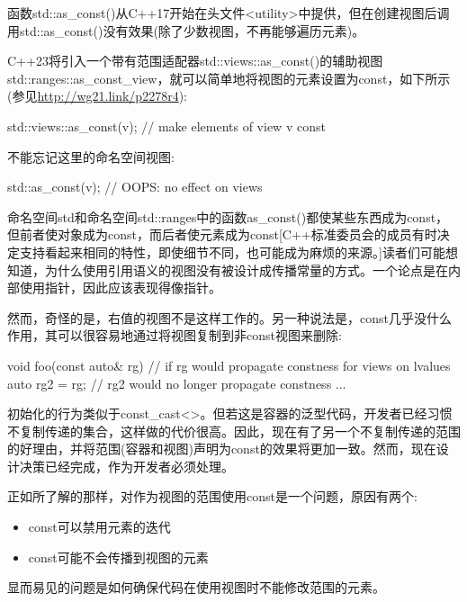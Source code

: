 函数std::as\_const()从C++17开始在头文件<utility>中提供，但在创建视图后调用std::as\_const()没有效果(除了少数视图，不再能够遍历元素)。

C++23将引入一个带有范围适配器std::views::as\_const()的辅助视图std::ranges::as\_const\_view，就可以简单地将视图的元素设置为const，如下所示(参见\url{http://wg21.link/p2278r4}):

\begin{cpp}
std::views::as_const(v); // make elements of view v const
\end{cpp}

不能忘记这里的命名空间视图:

\begin{cpp}
std::as_const(v); // OOPS: no effect on views
\end{cpp}

命名空间std和命名空间std::ranges中的函数as\_const()都使某些东西成为const，但前者使对象成为const，而后者使元素成为const[C++标准委员会的成员有时决定支持看起来相同的特性，即使细节不同，也可能成为麻烦的来源。]读者们可能想知道，为什么使用引用语义的视图没有被设计成传播常量的方式。一个论点是在内部使用指针，因此应该表现得像指针。

然而，奇怪的是，右值的视图不是这样工作的。另一种说法是，const几乎没什么作用，其可以很容易地通过将视图复制到非const视图来删除:

\begin{cpp}
void foo(const auto& rg) // if rg would propagate constness for views on lvalues
{
	auto rg2 = rg; // rg2 would no longer propagate constness
	...
}
\end{cpp}

初始化的行为类似于const\_cast<>。但若这是容器的泛型代码，开发者已经习惯不复制传递的集合，这样做的代价很高。因此，现在有了另一个不复制传递的范围的好理由，并将范围(容器和视图)声明为const的效果将更加一致。然而，现在设计决策已经完成，作为开发者必须处理。


正如所了解的那样，对作为视图的范围使用const是一个问题，原因有两个:

\begin{itemize}
\item
const可以禁用元素的迭代

\item
const可能不会传播到视图的元素
\end{itemize}

显而易见的问题是如何确保代码在使用视图时不能修改范围的元素。


